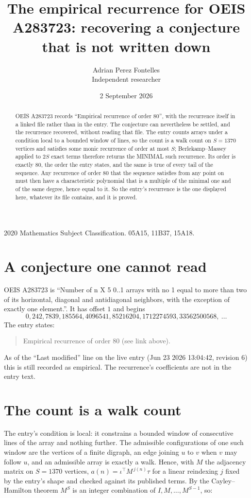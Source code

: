 \documentclass[11pt,a4paper]{article}
\title{The empirical recurrence for OEIS A283723: recovering a conjecture that is not written down}
\author{Adrian Perez Fontelles\\ \small Independent researcher}
\date{2 September 2026}
\theoremstyle{plain}
\theoremstyle{definition}
\begin{document}
\maketitle

\begin{abstract}
OEIS A283723 records ``Empirical recurrence of order $80$'', with the recurrence itself in a
linked file rather than in the entry. The conjecture can nevertheless be settled, and the
recurrence recovered, without reading that file. The entry counts arrays under a condition
local to a bounded window of lines, so the count is a walk count on $S=1370$ vertices and
satisfies some monic recurrence of order at most $S$; Berlekamp--Massey applied to $2S$ exact
terms therefore returns the MINIMAL such recurrence. Its order is exactly $80$, the order
the entry states, and the same is true of every tail of the sequence. Any recurrence of order
$80$ that the sequence satisfies from any point on must then have a characteristic
polynomial that is a multiple of the minimal one and of the same degree, hence equal to it. So
the entry's recurrence is the one displayed here, whatever its file contains, and it is
proved.
\end{abstract}

\noindent\small 2020 Mathematics Subject Classification. 05A15, 11B37, 15A18.\normalsize

\section{A conjecture one cannot read}

OEIS A283723 is ``Number of n X 5 0..1 arrays with no 1 equal to more than two of its horizontal, diagonal and antidiagonal neighbors, with the exception of exactly one element.''. It has offset $1$ and begins
\[
0, 242, 7839, 185564, 4096541, 85216204, 1712274593, 33562500568,\ \dots
\]
The entry states:
\begin{quote}
Empirical recurrence of order 80 (see link above).
\end{quote}
As of the ``Last modified'' line on the live entry (Jun 23 2026 13:04:42, revision 6) this is still
recorded as empirical. The recurrence's coefficients are not in the entry text.

\section{The count is a walk count}

The entry's condition is local: it constrains a bounded window of consecutive lines of the
array and nothing further. The admissible configurations of one such window are the vertices
of a finite digraph, an edge joining $u$ to $v$ when $v$ may follow $u$, and an admissible
array is exactly a walk. Hence, with $M$ the adjacency matrix on $S=1370$ vertices,
$a(n)=\iota^{\!\top}M^{\,j(n)}\tau$ for a linear reindexing $j$ fixed by the entry's shape
and checked against its published terms. By the Cayley--Hamilton theorem $M^{S}$ is an
integer combination of $I,M,\dots,M^{S-1}$, so:
\end{document}
